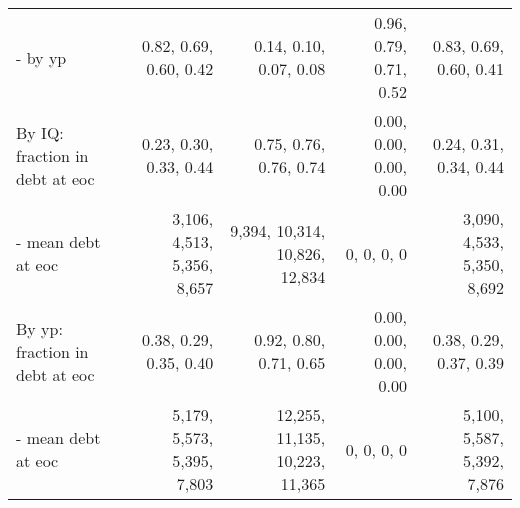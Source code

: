 \begin{tabular}{lrrrr}
- by yp & 0.82, 0.69, 0.60, 0.42  & 0.14, 0.10, 0.07, 0.08  & 0.96, 0.79, 0.71, 0.52  & 0.83, 0.69, 0.60, 0.41  \\
By IQ: fraction in debt at eoc & 0.23, 0.30, 0.33, 0.44  & 0.75, 0.76, 0.76, 0.74  & 0.00, 0.00, 0.00, 0.00  & 0.24, 0.31, 0.34, 0.44  \\
- mean debt at eoc & 3,106, 4,513, 5,356, 8,657  & 9,394, 10,314, 10,826, 12,834  & 0, 0, 0, 0  & 3,090, 4,533, 5,350, 8,692  \\
By yp: fraction in debt at eoc & 0.38, 0.29, 0.35, 0.40  & 0.92, 0.80, 0.71, 0.65  & 0.00, 0.00, 0.00, 0.00  & 0.38, 0.29, 0.37, 0.39  \\
- mean debt at eoc & 5,179, 5,573, 5,395, 7,803  & 12,255, 11,135, 10,223, 11,365  & 0, 0, 0, 0  & 5,100, 5,587, 5,392, 7,876  \\
\hline
\end{tabular}%
